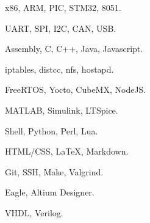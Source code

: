 
        {x86, ARM, PIC, STM32, 8051.}
        {}{}{}{}

        {UART, SPI, I2C, CAN, USB.}
        {}{}{}{}

        {Assembly, C, C++, Java, Javascript.}
        {}{}{}{}

        {iptables, distcc, nfs, hostapd.}
        {}{}{}{}

        {FreeRTOS, Yocto, CubeMX, NodeJS.}
        {}{}{}{}

        {MATLAB, Simulink, LTSpice.}
        {}{}{}{}

        {Shell, Python, Perl, Lua.}
        {}{}{}{}

        {HTML/CSS, {\LaTeX}, Markdown.}
        {}{}{}{}

        {Git, SSH, Make, Valgrind.}
        {}{}{}{}

        {Eagle, Altium Designer.}
        {}{}{}{}

        {VHDL, Verilog.}
        {}{}{}{}
